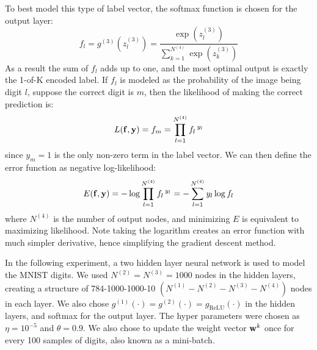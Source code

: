 To best model this type of label vector,
the softmax function is chosen for the output layer:
%
\begin{equation}
	f_l = 
	g^{(3)}(z_l^{(3)}) = \frac{\exp(z_l^{(3)})}
		{\sum_{k=1}^{N^{(4)}} \exp(z_k^{(3)})}
\end{equation}
%
\indent As a result the sum of $f_l$ adds up to one,
and the most optimal output is exactly the 1-of-K encoded label.
If $f_l$ is modeled as the probability of the image being digit $l$,
suppose the correct digit is $m$,
then the likelihood of making the correct prediction is:
%
\begin{equation}
  L(\mathbf{f},\mathbf{y}) = f_m = \prod_{l=1}^{N^{(4)}} f_l \, ^{y_l}
\end{equation}
%
since $y_m = 1$ is the only non-zero term in the label vector.
We can then define the error function as negative log-likelihood:
%
\begin{equation}
	E(\mathbf{f},\mathbf{y}) 
		= - \log \prod_{l=1}^{N^{(4)}} f_l \, ^{y_l}
		= - \sum_{l=1}^{N^{(4)}} y_l \log f_l
\end{equation}
%
where $N^{(4)}$ is the number of output nodes, 
and minimizing $E$ is equivalent to maximizing likelihood.
Note taking the logarithm creates an error function with much
simpler derivative, 
hence simplifying the gradient descent method.

In the following experiment, 
a two hidden layer neural network is used to model the MNIST digits.
We used $N^{(2)} = N^{(3)} = 1000$ nodes in the hidden layers, 
creating a structure of 784-1000-1000-10 
$\left( N^{(1)} - N^{(2)} - N^{(3)} - N^{(4)} \right)$
nodes in each layer.
We also chose 
$g^{(1)}(\cdot) = g^{(2)}(\cdot) = g_\text{ReLU}(\cdot)$ 
in the hidden layers,
and softmax for the output layer.
The hyper parameters were chosen as $\eta = 10^{-5}$
and $\theta = 0.9$.
We also chose to update the weight vector $\mathbf{w}^k$ once
for every 100 samples of digits,
also known as a mini-batch.

